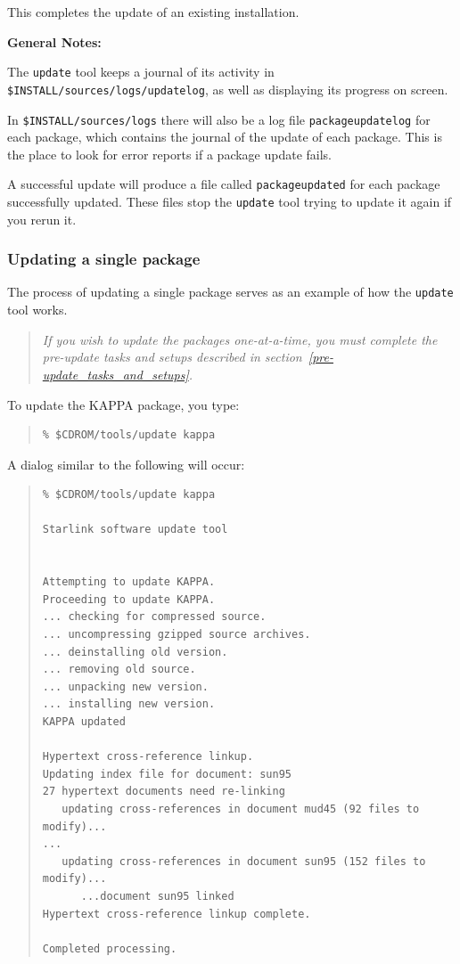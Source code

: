 \documentclass[twoside,11pt]{article}
\newcommand{\htmlref}[2]{#1}
\newcommand{\latex}[1]{#1}
\renewcommand{\_}{\texttt{\symbol{95}}}
\begin{document}
This completes the update of an existing installation.

\textbf{General Notes:}

The \texttt{update} tool keeps a journal of its activity in
\texttt{\$INSTALL/sources/logs/update\_log}, as well as
displaying its progress on screen.

In \texttt{\$INSTALL/sources/logs} there will also be a log file
\texttt{package\_update\_log} for each package, which contains the
journal of the update of each package.  This is the place to look for
error reports if a package update fails.

A successful update will produce a file called \texttt{package\_updated}
for each package successfully updated.  These files stop the
\texttt{update} tool trying to update it again if you rerun it.

\subsubsection{Updating a single package}

The process of updating a single package serves as an example of how the
\texttt{update} tool works.

\begin{quote}
\textit{If you wish to update the packages one-at-a-time, you must
complete the \htmlref{pre-update tasks and setups}{pre-update_tasks_and_setups}
\latex{described in section~\ref{pre-update_tasks_and_setups}}.}
\end{quote}

To update the KAPPA package, you type:

\begin{quote}
\begin{verbatim}
% $CDROM/tools/update kappa
\end{verbatim}
\end{quote}

A dialog similar to the following will occur:

\begin{quote}
\begin{small}
\begin{verbatim}
% $CDROM/tools/update kappa

Starlink software update tool


Attempting to update KAPPA.
Proceeding to update KAPPA.
... checking for compressed source.
... uncompressing gzipped source archives.
... deinstalling old version.
... removing old source.
... unpacking new version.
... installing new version.
KAPPA updated

Hypertext cross-reference linkup.
Updating index file for document: sun95
27 hypertext documents need re-linking
   updating cross-references in document mud45 (92 files to modify)...
...
   updating cross-references in document sun95 (152 files to modify)...
      ...document sun95 linked
Hypertext cross-reference linkup complete.

Completed processing.

\end{verbatim}
\end{small}
\end{quote}
\end{document}
